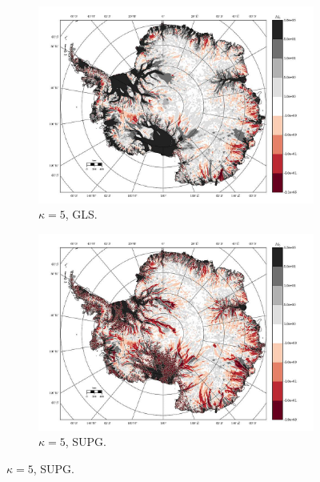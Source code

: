 \begin{figure}
  \begin{subfigure}[b]{0.45\linewidth}
    \includegraphics[width=\linewidth]{images/balance_velocity/antarctica/misfit_10H_kappa_5_GLS.jpg}
  \caption{$\kappa = 5$, GLS.}
  \label{antarctica_bv_image_kappa_5_GLS_misfit}
  \end{subfigure}
  \begin{subfigure}[b]{0.45\linewidth}
    \includegraphics[width=\linewidth]{images/balance_velocity/antarctica/misfit_10H_kappa_5_SUPG.jpg}
  \caption{$\kappa = 5$, SUPG.}
  \label{antarctica_bv_image_kappa_5_SUPG_misfit}
  \end{subfigure}


\end{figure}
